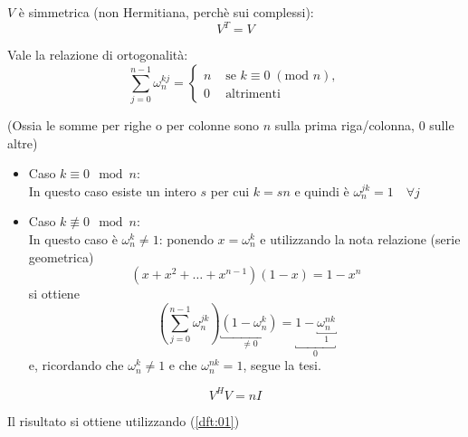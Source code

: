 \begin{property}
$V$ \`e simmetrica (non Hermitiana, perch\`e sui complessi):
 $$V^{T} = V$$
\end{property}

\begin{theo}
 Vale la relazione di ortogonalit\`a:
 \begin{equation}
   \label{dft:01}
    \displaystyle \sum_{j=0}^{n-1} \omega_{n}^{kj} =
      \left\{
      \begin{array}{ll}
        n & \text{ se } k \equiv 0\; (\text{mod } n), \\
        0 & \text{ altrimenti}
      \end{array}
    \right.   
 \end{equation}
 
(Ossia le somme per righe o per colonne sono  $n$ sulla prima riga/colonna,
      0 sulle altre)
\end{theo}
\begin{thproof}
\begin{itemize}
\item Caso  $k \equiv 0  \mod n$:  \\
In questo caso esiste un intero $s$ per cui $k=sn$
e quindi \`e $\omega_{n}^{jk}=1 \quad   \forall j $\\
\begin{comment}
  $$ \displaystyle \sum_{j=1}^{n-1}  \omega_n^{pnj} =
  \displaystyle \sum_{j=0}^{n-1} = n \quad \forall j$$
\end{comment}
\item Caso  $k \not \equiv 0 \mod n$:  \\
  In questo caso \`e $\omega_n^{k} \neq 1$: ponendo
  $x = \omega_n^{k}$ e utilizzando la nota relazione
  (serie geometrica)
  $$(x + x^{2} + \ldots + x^{n-1})(1-x) = 1 - x^{n}$$
  si ottiene
  $$
  \displaystyle (\sum_{j=0}^{n-1} \omega_n^{jk})\underbracket{(1 - \omega_n^{k})}_{\neq 0} 
  = \underbracket{1 - \underbracket{\omega_n^{nk}}_{1}}_{0}
  $$
  e, ricordando che $\omega_n^{k} \neq 1 $ e che $\omega_n^{nk} =1$,
  segue la tesi.
\end{itemize}  
\end{thproof}

\begin{property}
  $$V^{H}V = nI$$
\end{property}
Il risultato si ottiene utilizzando (\ref{dft:01})


